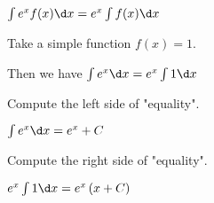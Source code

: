 \documentclass{ximera}
\author{Steven Gubkin}
\begin{document}
\begin{exercise}

$\int e^x f(x) \d x= e^x \int f(x) \d x$
\begin{hint}
Take a simple function $f(x)=1$. 

Then we have
$\int e^x  \d x= e^x \int1 \d x$

Compute the left  side of "equality".

$ \int e^x \d x=e^x+C$

Compute the right  side of "equality".

$e^x \int1 \d x=e^x\left(x+C\right)$
\end{hint}
	\begin{multipleChoice}	
	\end{multipleChoice}

\end{exercise}
\end{document}

